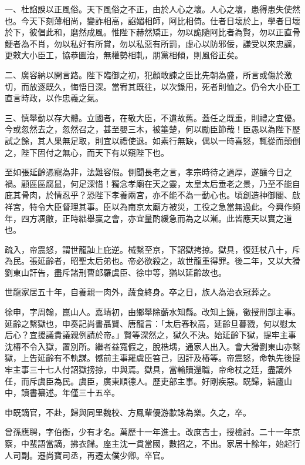 \begin{pinyinscope}
{{一、杜諂諛以正風俗。天下風俗之不正，由於人心之壞。人心之壞，患得患失使然也。今天下刻薄相尚，變詐相高，諂媚相師，阿比相倚。仕者日壞於上，學者日壞於下，彼倡此和，磨然成風。惟陛下赫然矯正，勿以詭隨阿比者為賢，勿以正直骨鯁者為不肖，勿以私好有所賞，勿以私惡有所罰，虛心以防邪佞，謙受以來忠讜，更敕大小臣工，協恭圖治，無權勢相軋，朋黨相傾，則風俗正矣。

二、廣容納以開言路。陛下臨御之初，犯顏敢諫之臣比先朝為盛，所言或傷於激切，而放逐既久，悔悟日深。當宥其既往，以次錄用，死者則恤之。仍令大小臣工直言時政，以作忠義之氣。

三、慎舉動以存大體。立國者，在敬大臣，不遺故舊。蓋任之既重，則禮之宜優。今或忽然去之，忽然召之，甚至嬰三木，被箠楚，何以勵臣節哉！臣愚以為陛下歷試之餘，其人果無足取，則宜以禮使退。如素行無缺，偶以一時喜怒，輒從而顛倒之，陛下固付之無心，而天下有以窺陛下也。

至如張延齡憑寵為非，法難容假。側聞長老之言，孝宗時待之過厚，遂釀今日之禍。顧區區腐鼠，何足深惜！獨念孝廟在天之靈，太皇太后垂老之景，乃至不能自庇其骨肉，於情忍乎？恐陛下孝養兩宮，亦不能不為一動心也。頃創造神御閣、啟祥宮，特令大臣督理其事。臣以為南京太廟方被災，工役之急當無過此。今興作頻年，四方凋敝，正時絀舉贏之會，亦宜量酌緩急而為之以漸。此皆應天以實之道也。

疏入，帝震怒，謂世龍訕上庇逆。械繫至京，下詔獄拷掠。獄具，復廷杖八十，斥為民。張延齡者，昭聖太后弟也。帝必欲殺之，故世龍重得罪。後二年，又以大猾劉東山訐告，盡斥諸刑曹郎羅虞臣、徐申等，猶以延齡故也。

世龍家居五十年，自養親一肉外，蔬食終身。卒之日，族人為治衣冠葬之。

徐申，字周翰，崑山人。嘉靖初，由鄉舉除蘄水知縣。改知上鐃，徵授刑部主事。延齡之繫獄也，申奏記尚書聶賢、唐龍言：「太后春秋高，延齡旦暮戮，何以慰太后心？宜援議貴議親例請於帝。」賢等深然之，獄久不決。始延齡下獄，提牢主事沈椿不令入獄，置別所。繼者益寬假之，脫梏堣，通家人出入。會大猾劉東山亦繫獄，上告延齡有不軌謀。憾前主事羅虞臣笞己，因訐及椿等。帝震怒，命執先後提牢主事三十七人付詔獄搒掠，申與焉。獄具，當輸贖還職，帝命杖之廷，盡謫外任，而斥虞臣為民。虞臣，廣東順德人。歷吏部主事。好剛疾惡。既歸，結廬山中，讀書纂述。年僅三十五卒。

申既謫官，不赴，歸與同里魏校、方鳳輩優游歗詠為樂。久之，卒。

曾孫應聘，字伯衡，少有才名。萬歷十一年進士。改庶吉士，授檢討。二十一年京察，中蜚語當謫，拂衣歸。座主沈一貫當國，數招之，不出。家居十餘年，始起行人司副。遷尚寶司丞，再遷太僕少卿。卒官。

}}
\end{pinyinscope}
